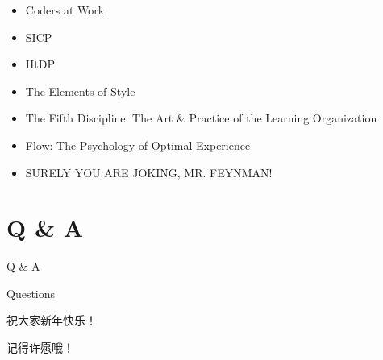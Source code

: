 \documentclass[presentation,dvipdfmx,CJKbookmarks]{beamer}
\begin{document}
\begin{CJK*}{UTF8}{simsun}
\begin{frame}[label={sec:org5acd3ec}]{}
\begin{itemize}
\item Coders at Work
\item SICP
\item HtDP
\item The Elements of Style
\item The Fifth Discipline: The Art \& Practice of the Learning Organization
\item Flow: The Psychology of Optimal Experience
\item SURELY YOU ARE JOKING, MR. FEYNMAN!
\end{itemize}
\end{frame}
\section{Q \& A}
\label{sec:org9a19001}
\begin{frame}[label={sec:org7816a48}]{Q \& A}
\begin{block}{Questions}
\pause
\end{block}
\begin{block}{祝大家新年快乐！}
\pause
\end{block}
\begin{block}{记得许愿哦！}
\end{block}
\end{frame}
\end{CJK*}
\end{document}
